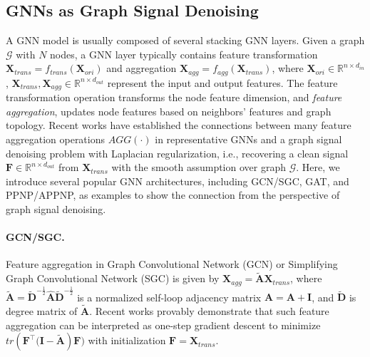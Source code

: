 \documentclass[letterpaper]{article} %
\theoremstyle{plain}
\theoremstyle{definition}
\theoremstyle{remark}
\begin{document}
\subsection{GNNs as Graph Signal Denoising}
A GNN model is usually composed of several stacking GNN layers. Given a graph $\mathcal{G}$ with $N$ nodes, a GNN layer typically contains feature transformation $\mathbf{X}_{trans}=f_{trans}(\mathbf{X}_{ori})$ and aggregation $\mathbf{X}_{agg}=f_{agg}(\mathbf{X}_{trans})$, where $\mathbf{X}_{ori}\in\mathbb{R}^{n\times d_{in}}$, $\mathbf{X}_{trans}, \mathbf{X}_{agg}\in\mathbb{R}^{n\times d_{out}}$ represent the input and output features. The feature transformation operation transforms the node feature dimension, and \emph{feature aggregation}, updates node features based on neighbors' features and graph topology. Recent works \citep{ma2021unified, zhu2021interpreting} have established the connections between many feature aggregation operations $AGG(\cdot)$  in representative GNNs and a graph signal denoising problem with Laplacian regularization, i.e., recovering a clean signal $\mathbf{F}\in\mathbb{R}^{n\times d_{out}}$ from $\mathbf{X}_{trans}$ with the smooth
assumption over graph $\mathcal{G}$. Here, we introduce several popular GNN architectures, including GCN/SGC, GAT, and PPNP/APPNP, as examples to show the connection from the perspective of graph signal denoising. 

\paragraph{GCN/SGC.} Feature aggregation in Graph Convolutional Network (GCN) or Simplifying Graph Convolutional Network (SGC) is given by $\mathbf{X}_{agg}=\tilde{\mathbf{A}}\mathbf{X}_{trans}$, where $\tilde{\mathbf{A}}=\tilde{\mathbf{D}}^{-\frac{1}{2}}\hat{\mathbf{A}}\tilde{\mathbf{D}}^{-\frac{1}{2}}$ is a normalized self-loop adjacency matrix $\hat{\mathbf{A}}=\mathbf{A}+\mathbf{I}$, and $\tilde{\mathbf{D}}$ is degree matrix of $\tilde{\mathbf{A}}$. Recent works \citep{ma2021unified, zhu2021interpreting} provably demonstrate that such feature aggregation can be interpreted as one-step gradient descent to minimize $tr(\mathbf{F}^{\top}\big(\mathbf{I}-\tilde{\mathbf{A}})\mathbf{F}\big)$ with initialization $\mathbf{F}=\mathbf{X}_{trans}$.
\end{document}
